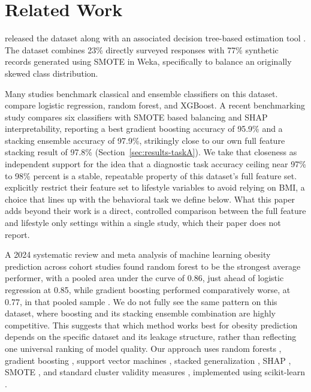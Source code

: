 \documentclass[journal]{IEEEtran}
\begin{document}
\section{Related Work}
\label{sec:related}

\cite{palechor2019dataset} released the dataset along with an associated decision tree-based estimation tool \cite{delahoz2019obesity}. The dataset combines 23\% directly surveyed responses with 77\% synthetic records generated using SMOTE \cite{chawla2002smote} in Weka, specifically to balance an originally skewed class distribution.

Many studies benchmark classical and ensemble classifiers on this dataset. \cite{ratih2019estimation} compare logistic regression, random forest, and XGBoost. A recent benchmarking study \cite{benchmarking2025shap} compares six classifiers with SMOTE based balancing and SHAP interpretability, reporting a best gradient boosting accuracy of 95.9\% and a stacking ensemble accuracy of 97.9\%, strikingly close to our own full feature stacking result of 97.8\% (Section~\ref{sec:results-taskA}). We take that closeness as independent support for the idea that a diagnostic task accuracy ceiling near 97\% to 98\% percent is a stable, repeatable property of this dataset's full feature set. \cite{oyelude2023lifestyle} explicitly restrict their feature set to lifestyle variables to avoid relying on BMI, a choice that lines up with the behavioral task we define below. What this paper adds beyond their work is a direct, controlled comparison between the full feature and lifestyle only settings within a single study, which their paper does not report.

A 2024 systematic review and meta analysis of machine learning obesity prediction across cohort studies found random forest to be the strongest average performer, with a pooled area under the curve of 0.86, just ahead of logistic regression at 0.85, while gradient boosting performed comparatively worse, at 0.77, in that pooled sample \cite{freitas2024metaanalysis}. We do not fully see the same pattern on this dataset, where boosting and its stacking ensemble combination are highly competitive. This suggests that which method works best for obesity prediction depends on the specific dataset and its leakage structure, rather than reflecting one universal ranking of model quality. Our approach uses random forests \cite{breiman2001randomforests}, gradient boosting \cite{friedman2001gradientboosting}, support vector machines \cite{cortes1995svm}, stacked generalization \cite{wolpert1992stacked}, SHAP \cite{lundberg2017shap}, SMOTE \cite{chawla2002smote}, and standard cluster validity measures \cite{rousseeuw1987silhouettes, daviesbouldin1979}, implemented using scikit-learn \cite{scikit-learn}.
\end{document}
